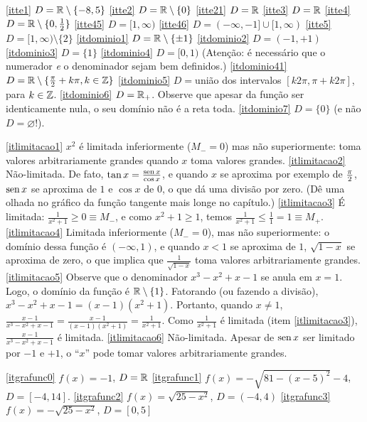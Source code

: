 \begin{Solution}{2.1}
\eqref{itte1} $D=\mathbb{R}\setminus\{-8,5\}$
\eqref{itte2} $D=\mathbb{R}\setminus\{0\}$
\eqref{itte21} $D=\mathbb{R}$
\eqref{itte3} $D=\mathbb{R}$
\eqref{itte4} $D=\mathbb{R}\setminus\{0,\tfrac12\}$
\eqref{itte45} $D=[1,\infty)$
\eqref{itte46} $D=(-\infty,-1]\cup [1,\infty)$
\eqref{itte5} $D=[1,\infty ) \setminus \{2\}$
\eqref{itdominio1} $D=\mathbb{R}\setminus\{\pm 1\}$
\eqref{itdominio2} $D=(-1,+1)$
\eqref{itdominio3} $D=\{1\}$
 \eqref{itdominio4} $D=[0,1)$ (Atenção: é necessário que o numerador \emph{e} o
denominador sejam bem definidos.)
\eqref{itdominio41} $D=\mathbb{R}\setminus \{\tfrac{\pi}{2}+k\pi, k\in \mathbb{Z}\}$
\eqref{itdominio5} $D=$união dos intervalos $[k2\pi,\pi +k2\pi]$, para $k\in \mathbb{Z}$.
 \eqref{itdominio6} $D=\mathbb{R}_+$. Observe que apesar da função ser identicamente nula, o seu
domínio não é a reta toda.
\eqref{itdominio7} $D=\{0\}$ (e não $D=\varnothing$!).
\end{Solution}
\begin{Solution}{2.2}
\eqref{itlimitacao1} $x^2$ é limitada inferiormente ($M_-=0$) mas não
superiormente: toma valores arbitrariamente grandes quando
$x$ toma valores grandes. \eqref{itlimitacao2} Não-limitada. De fato, $\tan x=\frac{\operatorname{sen}
x}{\cos x}$, e quando $x$ se aproxima por exemplo de $\tfrac{\pi}{2}$, $\operatorname{sen} x$ se aproxima
de $1$ e $\cos x$ de $0$, o que dá uma divisão por zero. (Dê uma olhada no gráfico da
função tangente mais longe no capítulo.) \eqref{itlimitacao3} É limitada:
$\tfrac{1}{x^2+1}\geq 0\equiv M_-$, e como $x^2+1\geq
1$, temos
$\frac{1}{x^2+1}\leq \tfrac11=1\equiv M_+$. \eqref{itlimitacao4} Limitada
inferiormente ($M_-=0$), mas não superiormente: o domínio
dessa função é $(-\infty,1)$, e quando $x<1$ se aproxima de $1$, $\sqrt{1-x}$ se aproxima
de zero, o que implica que $\frac{1}{\sqrt{1-x}}$ toma valores arbitrariamente grandes.
\eqref{itlimitacao5} Observe que o denominador $x^3-x^2+x-1$ se anula em $x=1$. Logo, o
domínio da função é $\mathbb{R}\setminus \{1\}$. Fatorando (ou fazendo a divisão),
$x^3-x^2+x-1=(x-1)(x^2+1)$. Portanto, quando $x\neq 1$,
$\frac{x-1}{x^3-x^2+x-1}=\frac{x-1}{(x-1)(x^2+1)}=\frac{1}{x^2+1}$. Como $\frac{1}{x^2+1}$
é limitada (item \eqref{itlimitacao3}), $\frac{x-1}{x^3-x^2+x-1}$ é limitada.
\eqref{itlimitacao6} Não-limitada. Apesar de $\operatorname{sen} x$ ser limitado por $-1$ e $+1$,
o ``$x$'' pode tomar valores arbitrariamente grandes.
\end{Solution}
\begin{Solution}{2.3}
\eqref{itgrafunc0} $f(x)=-1$, $D=\mathbb{R}$
\eqref{itgrafunc1} $f(x)=-\sqrt{81-(x-5)^2}-4$, $D=[-4,14]$.
\eqref{itgrafunc2} $f(x)=\sqrt{25-x^2}$, $D=(-4,4)$
\eqref{itgrafunc3} $f(x)=-\sqrt{25-x^2}$, $D=[0,5]$
\end{Solution}
